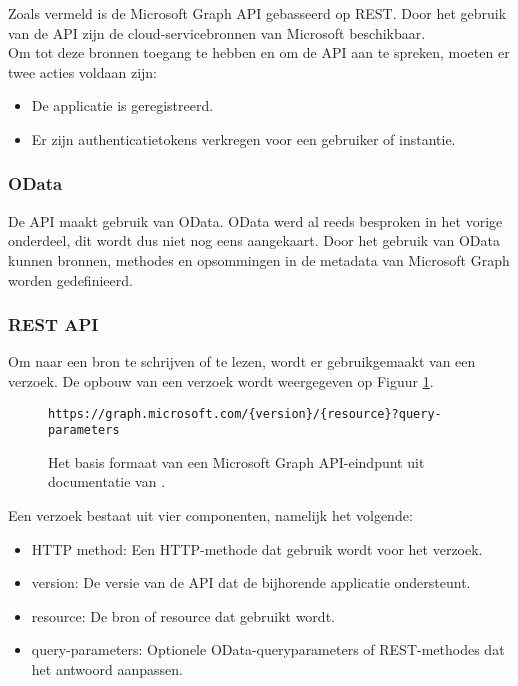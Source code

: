 Zoals vermeld is de Microsoft Graph \Ac{API} gebasseerd op \Ac{REST}. Door het gebruik van de \ac{API} zijn de cloud-servicebronnen van Microsoft beschikbaar. \\

Om tot deze bronnen toegang te hebben en om de \Ac{API} aan te spreken, moeten er twee acties voldaan zijn:

\begin{itemize}
    \item De applicatie is geregistreerd.
    \item Er zijn authenticatietokens verkregen voor een gebruiker of instantie.
\end{itemize}

\subsubsection{OData}

De \ac{API} maakt gebruik van OData. OData werd al reeds besproken in het vorige onderdeel, dit wordt dus niet nog eens aangekaart. Door het gebruik van OData kunnen bronnen, methodes en opsommingen in de metadata van Microsoft Graph worden gedefinieerd.

\subsubsection{REST API}

Om naar een bron te schrijven of te lezen, wordt er gebruikgemaakt van een verzoek. De opbouw van een verzoek wordt weergegeven op Figuur \ref{RAM}. \\

\begin{figure}[h]
    \footnotesize\begin{verbatim}https://graph.microsoft.com/{version}/{resource}?query-parameters
    \end{verbatim}    
    \caption[Basis formaat Microsoft Graph API-eindpunt]{Het basis formaat van een Microsoft Graph \Ac{API}-eindpunt uit documentatie van \textcite{Microsoft2023o}.}
    \label{RAM}
\end{figure}

Een verzoek bestaat uit vier componenten, namelijk het volgende: 

\begin{itemize}
    \item \ac{HTTP} method: Een \ac{HTTP}-methode dat gebruik wordt voor het verzoek.
    \item version: De versie van de \ac{API} dat de bijhorende applicatie ondersteunt.
    \item resource: De bron of resource dat gebruikt wordt.
    \item query-parameters: Optionele OData-queryparameters of \Ac{REST}-methodes dat het antwoord aanpassen.
\end{itemize}

